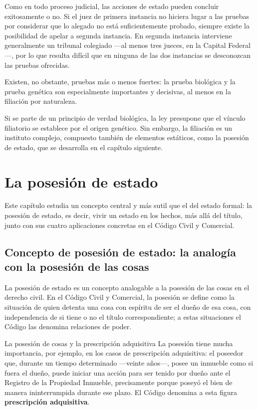 \documentclass[12pt,oneside]{book}
\begin{document}
Como en todo proceso judicial, las acciones de estado pueden concluir exitosamente o no. Si el juez de primera instancia no hiciera lugar a las pruebas por considerar que lo alegado no está suficientemente probado, siempre existe la posibilidad de apelar a segunda instancia. En segunda instancia interviene generalmente un tribunal colegiado —al menos tres jueces, en la Capital Federal—, por lo que resulta difícil que en ninguna de las dos instancias se desconozcan las pruebas ofrecidas.

Existen, no obstante, pruebas más o menos fuertes: la prueba biológica y la prueba genética son especialmente importantes y decisivas, al menos en la filiación por naturaleza.

\begin{important}
Si se parte de un principio de verdad biológica, la ley presupone que el vínculo filiatorio se establece por el origen genético. Sin embargo, la filiación es un instituto complejo, compuesto también de elementos estáticos, como la posesión de estado, que se desarrolla en el capítulo siguiente.
\end{important}

\chapter{La posesión de estado}

Este capítulo estudia un concepto central y más sutil que el del estado formal: la posesión de estado, es decir, vivir un estado en los hechos, más allá del título, junto con sus cuatro aplicaciones concretas en el Código Civil y Comercial.

\section{Concepto de posesión de estado: la analogía con la posesión de las cosas}

La posesión de estado es un concepto analogable a la posesión de las cosas en el derecho civil. En el Código Civil y Comercial, la posesión se define como la situación de quien detenta una cosa con espíritu de ser el dueño de esa cosa, con independencia de si tiene o no el título correspondiente; a estas situaciones el Código las denomina relaciones de poder.

\begin{example}{La posesión de cosas y la prescripción adquisitiva}
La posesión tiene mucha importancia, por ejemplo, en los casos de prescripción adquisitiva: el poseedor que, durante un tiempo determinado —veinte años—, posee un inmueble como si fuera el dueño, puede iniciar una acción para ser tenido por dueño ante el Registro de la Propiedad Inmueble, precisamente porque poseyó el bien de manera ininterrumpida durante ese plazo. El Código denomina a esta figura \textbf{prescripción adquisitiva}.
\end{example}
\end{document}
